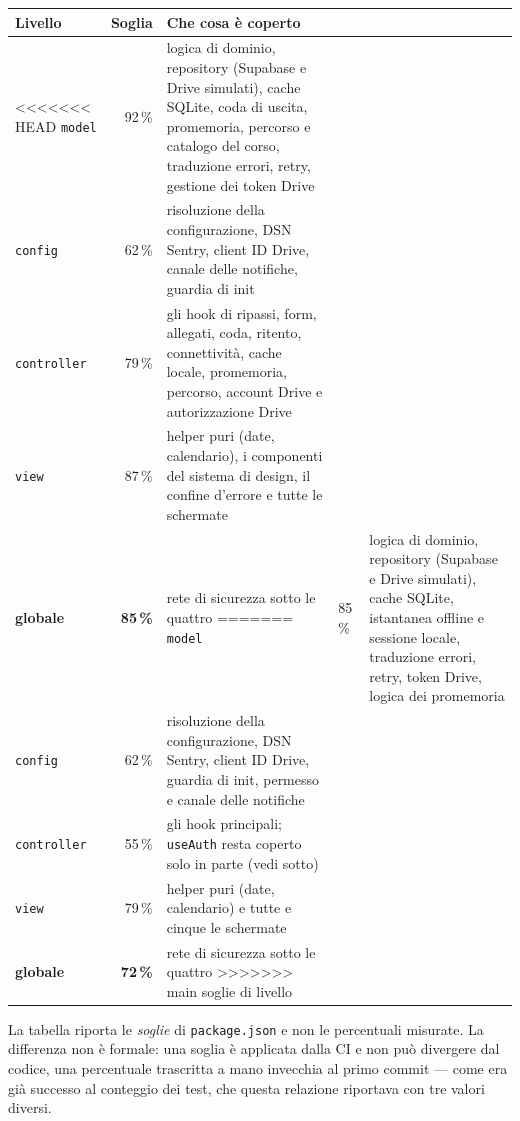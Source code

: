 \documentclass[11pt,a4paper]{report}
\begin{document}
\begin{center}
\small
\begin{tabular}{@{}lrp{8.4cm}@{}}
\toprule
\textbf{Livello} & \textbf{Soglia} & \textbf{Che cosa \`e coperto} \\
\midrule
<<<<<<< HEAD
\texttt{model} & 92\,\% & logica di dominio, repository (Supabase e Drive
  simulati), cache SQLite, coda di uscita, promemoria, percorso e catalogo
  del corso, traduzione errori, retry, gestione dei token Drive \\
\texttt{config} & 62\,\% & risoluzione della configurazione, DSN Sentry,
  client ID Drive, canale delle notifiche, guardia di init \\
\texttt{controller} & 79\,\% & gli hook di ripassi, form, allegati, coda,
  ritento, connettivit\`a, cache locale, promemoria, percorso, account Drive e
  autorizzazione Drive \\
\texttt{view} & 87\,\% & helper puri (date, calendario), i componenti del
  sistema di design, il confine d'errore e tutte le schermate \\
\midrule
\textbf{globale} & \textbf{85\,\%} & rete di sicurezza sotto le quattro
=======
\texttt{model} & 85\,\% & logica di dominio, repository (Supabase e Drive
  simulati), cache SQLite, istantanea offline e sessione locale, traduzione
  errori, retry, token Drive, logica dei promemoria \\
\texttt{config} & 62\,\% & risoluzione della configurazione, DSN Sentry,
  client ID Drive, guardia di init, permesso e canale delle notifiche \\
\texttt{controller} & 55\,\% & gli hook principali; \texttt{useAuth} resta
  coperto solo in parte (vedi sotto) \\
\texttt{view} & 79\,\% & helper puri (date, calendario) e tutte e cinque le
  schermate \\
\midrule
\textbf{globale} & \textbf{72\,\%} & rete di sicurezza sotto le quattro
>>>>>>> main
  soglie di livello \\
\bottomrule
\end{tabular}
\end{center}

La tabella riporta le \emph{soglie} di \texttt{package.json} e non le
percentuali misurate. La differenza non \`e formale: una soglia \`e applicata
dalla CI e non pu\`o divergere dal codice, una percentuale trascritta a mano
invecchia al primo commit --- come era gi\`a successo al conteggio dei test,
che questa relazione riportava con tre valori diversi.
\end{document}
